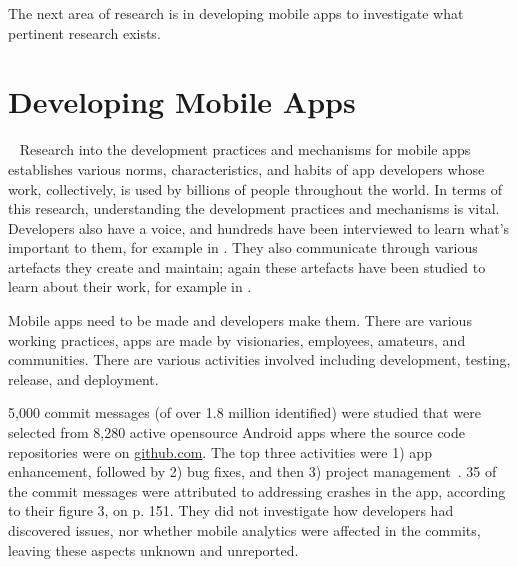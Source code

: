 
The next area of research is in developing mobile apps to investigate what pertinent research exists.


\section{Developing Mobile Apps}~\label{rw-developing-mobile-apps-section}
Research into the development practices and mechanisms for mobile apps establishes various norms, characteristics, and habits of app developers whose work, collectively, is used by billions of people throughout the world. In terms of this research, understanding the development practices and mechanisms is vital. Developers also have a voice, and hundreds have been interviewed to learn what's important to them, for example in . They also communicate through various artefacts they create and maintain; again these artefacts have been studied to learn about their work, for example in .


Mobile apps need to be made and developers make them. There are various working practices, apps are made by visionaries, employees, amateurs, and communities. There are various activities involved including development, testing, release, and deployment. %

5,000 commit messages (of over 1.8 million identified) were studied that were selected from 8,280 active opensource Android apps where the source code repositories were on \href{https://github.com/}{github.com}. The top three activities were 1) app enhancement, followed by 2) bug fixes, and then 3) project management~. 35 of the commit messages were attributed to addressing crashes in the app, according to their figure 3, on p. 151. They did not investigate how developers had discovered issues, nor whether mobile analytics were affected in the commits, leaving these aspects unknown and unreported.

